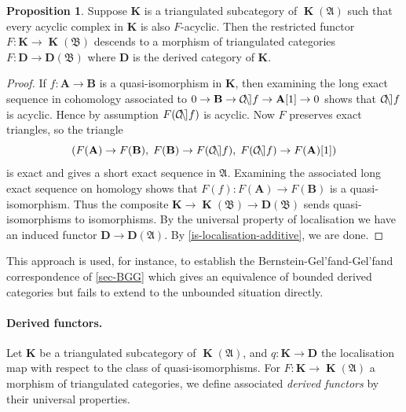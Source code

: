 \documentclass[a4paper]{article}
\theoremstyle{definition}
\newtheorem{prop}[defn]{Proposition}
\theoremstyle{remark}
\DeclareMathOperator{\cone}{\mathcal{C\kern -2pt o \kern -2pt n \kern -2pt e
\kern -2pt}}
\DeclareMathOperator{\kom}{{\mathbf{K}}}
\newcommand{\deri}{\mathbf{D}}
\begin{document}
\begin{prop}\label{smaller-trianglecat}
    Suppose \(\mathbf{K}\) is a triangulated subcategory of \(\kom(\mathfrak{A})\)
    such that every acyclic complex in \(\mathbf{K}\) is also \(F\)-acyclic.
    Then the restricted functor \(F:\mathbf{K}\rightarrow \kom(\mathfrak{B})\)
    descends to a morphism of triangulated categories \(F:
    \mathbf{D}\rightarrow \deri(\mathfrak{B})\) where \(\mathbf{D}\) is the derived
    category of \(\mathbf{K}\).
    \begin{proof}
        If \(f:\mathbf{A}\rightarrow \mathbf{B}\) is a quasi-isomorphism in
        \(\mathbf{K}\), then examining the long exact sequence in cohomology
        associated to \(0\rightarrow \mathbf{B}\rightarrow \cone f \rightarrow
        \mathbf{A}[1] \rightarrow 0\) shows that \(\cone f\) is acyclic. Hence
        by assumption \(F(\cone f)\) is acyclic. Now \(F\) preserves exact
        triangles, so the triangle 
        \[(F(\mathbf{A})\rightarrow F(\mathbf{B}), \; F(\mathbf{B})\rightarrow
        F(\cone f), \; F(\cone f)\rightarrow F(\mathbf{A})[1])\]
        is exact and gives a short exact sequence in \(\mathfrak{A}\). Examining
        the associated long exact sequence on homology shows that
        \(F(f):F(\mathbf{A})\rightarrow F(\mathbf{B})\) is a quasi-isomorphism.
        Thus the composite \({\mathbf{K}\rightarrow \kom(\mathfrak{B})\rightarrow
        \deri(\mathfrak{B})}\) sends quasi-isomorphisms to isomorphisms. By
        the universal property of localisation we have an induced functor
        \({\mathbf{D}\rightarrow \deri(\mathfrak{A})}\). By
        \cref{is-localisation-additive}, we are done.
    \end{proof}
\end{prop}

This approach is used, for instance, to establish the
Bernstein-Gel'fand-Gel'fand correspondence of \cref{sec-BGG} which gives an
equivalence of bounded derived categories but fails to extend to the unbounded
situation directly.

\paragraph{Derived functors.} Let \(\mathbf{K}\) be a triangulated subcategory
of \(\kom(\mathfrak{A})\), and \(q:\mathbf{K}\rightarrow \mathbf{D}\) the
localisation map with respect to the class of quasi-isomorphisms. For
\(F:\mathbf{K}\rightarrow \kom(\mathfrak{A})\) a morphism of triangulated
categories, we define associated \textit{derived functors} by their universal
properties. 
\end{document}
